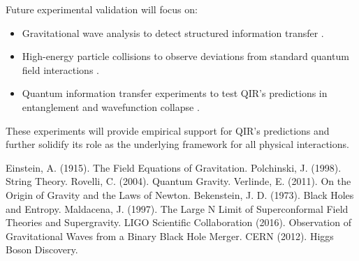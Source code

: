 \documentclass{article}
\begin{document}
Future experimental validation will focus on:
\begin{itemize}
    \item Gravitational wave analysis to detect structured information transfer \cite{ligo}.
    \item High-energy particle collisions to observe deviations from standard quantum field interactions \cite{cernlhc}.
    \item Quantum information transfer experiments to test QIR’s predictions in entanglement and wavefunction collapse \cite{quantuminformation}.
\end{itemize}
These experiments will provide empirical support for QIR's predictions and further solidify its role as the underlying framework for all physical interactions.

\begin{thebibliography}{99}
 Einstein, A. (1915). The Field Equations of Gravitation.
 Polchinski, J. (1998). String Theory.
 Rovelli, C. (2004). Quantum Gravity.
 Verlinde, E. (2011). On the Origin of Gravity and the Laws of Newton.
 Bekenstein, J. D. (1973). Black Holes and Entropy.
 Maldacena, J. (1997). The Large N Limit of Superconformal Field Theories and Supergravity.
 LIGO Scientific Collaboration (2016). Observation of Gravitational Waves from a Binary Black Hole Merger.
 CERN (2012). Higgs Boson Discovery.
\end{thebibliography}
\end{document}
